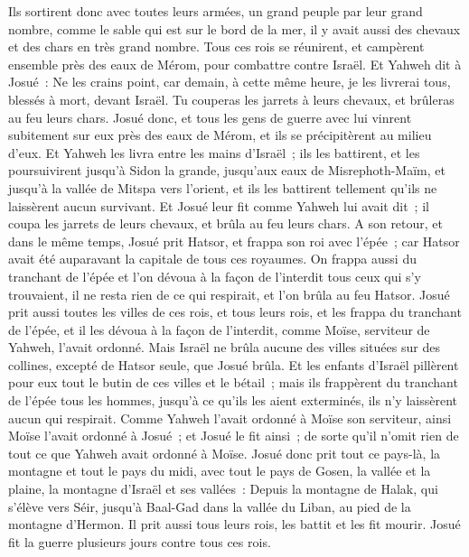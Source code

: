 \begin{multicols}{2}
Ils sortirent donc avec toutes leurs armées, un grand peuple par leur grand nombre, comme le sable qui est sur le bord de la mer, il y avait aussi des chevaux et des chars en très grand nombre.
Tous ces rois se réunirent, et campèrent ensemble près des eaux de Mérom, pour combattre contre Israël.
Et Yahweh dit à Josué~: Ne les crains point, car demain, à cette même heure, je les livrerai tous, blessés à mort, devant Israël. Tu couperas les jarrets à leurs chevaux, et brûleras au feu leurs chars.
Josué donc, et tous les gens de guerre avec lui vinrent subitement sur eux près des eaux de Mérom, et ils se précipitèrent au milieu d'eux.
Et Yahweh les livra entre les mains d'Israël~; ils les battirent, et les poursuivirent jusqu'à Sidon la grande, jusqu'aux eaux de Misrephoth-Maïm, et jusqu'à la vallée de Mitspa vers l'orient, et ils les battirent tellement qu'ils ne laissèrent aucun survivant.
Et Josué leur fit comme Yahweh lui avait dit~; il coupa les jarrets de leurs chevaux, et brûla au feu leurs chars.
A son retour, et dans le même temps, Josué prit Hatsor, et frappa son roi avec l'épée~; car Hatsor avait été auparavant la capitale de tous ces royaumes.
On frappa aussi du tranchant de l'épée et l'on dévoua à la façon de l'interdit tous ceux qui s'y trouvaient, il ne resta rien de ce qui respirait, et l'on brûla au feu Hatsor.
Josué prit aussi toutes les villes de ces rois, et tous leurs rois, et les frappa du tranchant de l'épée, et il les dévoua à la façon de l'interdit, comme Moïse, serviteur de Yahweh, l'avait ordonné.
Mais Israël ne brûla aucune des villes situées sur des collines, excepté de Hatsor seule, que Josué brûla.
Et les enfants d'Israël pillèrent pour eux tout le butin de ces villes et le bétail~; mais ils frappèrent du tranchant de l'épée tous les hommes, jusqu'à ce qu'ils les aient exterminés, ils n'y laissèrent aucun qui respirait.
Comme Yahweh l'avait ordonné à Moïse son serviteur, ainsi Moïse l'avait ordonné à Josué~; et Josué le fit ainsi~; de sorte qu'il n'omit rien de tout ce que Yahweh avait ordonné à Moïse. 
Josué donc prit tout ce pays-là, la montagne et tout le pays du midi, avec tout le pays de Gosen, la vallée et la plaine, la montagne d'Israël et ses vallées~:
Depuis la montagne de Halak, qui s'élève vers Séir, jusqu'à Baal-Gad dans la vallée du Liban, au pied de la montagne d'Hermon. Il prit aussi tous leurs rois, les battit et les fit mourir.
 Josué fit la guerre plusieurs jours contre tous ces rois.

\end{multicols}
